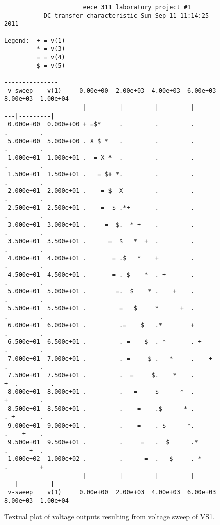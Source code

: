\documentclass{article}
\begin{document}
\begin{figure}
{\footnotesize
\begin{verbatim}
                      eece 311 laboratory project #1
           DC transfer characteristic Sun Sep 11 11:14:25  2011

Legend:  + = v(1)             
         * = v(3)             
         = = v(4)             
         $ = v(5)             
--------------------------------------------------------------------------
 v-sweep    v(1)     0.00e+00  2.00e+03  4.00e+03  6.00e+03  8.00e+03  1.00e+04 
----------------------|---------|---------|---------|---------|---------|
 0.000e+00  0.000e+00 + =$*     .         .         .         .         . 
 5.000e+00  5.000e+00 . X $ *   .         .         .         .         . 
 1.000e+01  1.000e+01 .  = X *  .         .         .         .         . 
 1.500e+01  1.500e+01 .   = $+ *.         .         .         .         . 
 2.000e+01  2.000e+01 .    = $  X         .         .         .         . 
 2.500e+01  2.500e+01 .    =  $ .*+       .         .         .         . 
 3.000e+01  3.000e+01 .     =  $.  * +    .         .         .         . 
 3.500e+01  3.500e+01 .      =  $   *  +  .         .         .         . 
 4.000e+01  4.000e+01 .       = .$   *    +         .         .         . 
 4.500e+01  4.500e+01 .       = . $    *  . +       .         .         . 
 5.000e+01  5.000e+01 .        =.  $    * .    +    .         .         . 
 5.500e+01  5.500e+01 .         =   $     *      +  .         .         . 
 6.000e+01  6.000e+01 .         .=    $   .*        +         .         . 
 6.500e+01  6.500e+01 .         . =    $  . *       . +       .         . 
 7.000e+01  7.000e+01 .         . =     $ .   *     .    +    .         . 
 7.500e+01  7.500e+01 .         .  =     $.    *    .      +  .         . 
 8.000e+01  8.000e+01 .         .   =     $      *  .         +         . 
 8.500e+01  8.500e+01 .         .    =    .$      * .         . +       . 
 9.000e+01  9.000e+01 .         .    =    . $      *.         .    +    . 
 9.500e+01  9.500e+01 .         .     =   .  $      .*        .      +  . 
 1.000e+02  1.000e+02 .         .      =  .   $     . *       .         + 
----------------------|---------|---------|---------|---------|---------|
 v-sweep    v(1)     0.00e+00  2.00e+03  4.00e+03  6.00e+03  8.00e+03  1.00e+04 
\end{verbatim}
}
\caption{Textual plot of voltage outputs resulting from voltage sweep of VS1.}
\label{fig:spicevoltplot}
\end{figure}
\end{document}

